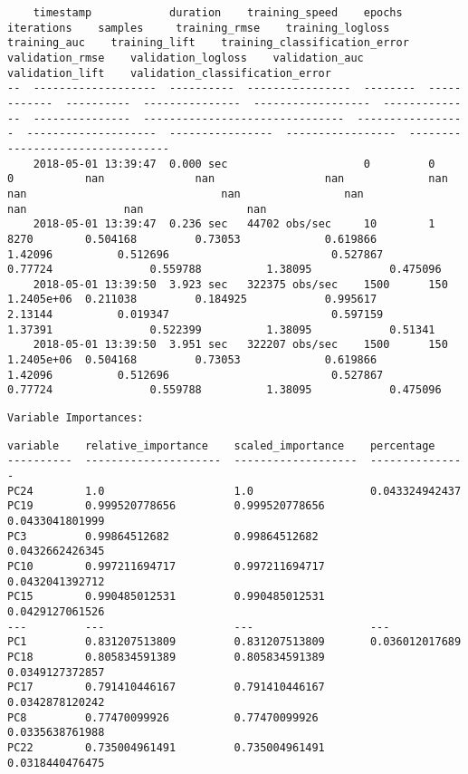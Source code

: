 \documentclass[11pt]{article}
\begin{document}
    
    \begin{verbatim}
    timestamp            duration    training_speed    epochs    iterations    samples     training_rmse    training_logloss    training_auc    training_lift    training_classification_error    validation_rmse    validation_logloss    validation_auc    validation_lift    validation_classification_error
--  -------------------  ----------  ----------------  --------  ------------  ----------  ---------------  ------------------  --------------  ---------------  -------------------------------  -----------------  --------------------  ----------------  -----------------  ---------------------------------
    2018-05-01 13:39:47  0.000 sec                     0         0             0           nan              nan                 nan             nan              nan                              nan                nan                   nan               nan                nan
    2018-05-01 13:39:47  0.236 sec   44702 obs/sec     10        1             8270        0.504168         0.73053             0.619866        1.42096          0.512696                         0.527867           0.77724               0.559788          1.38095            0.475096
    2018-05-01 13:39:50  3.923 sec   322375 obs/sec    1500      150           1.2405e+06  0.211038         0.184925            0.995617        2.13144          0.019347                         0.597159           1.37391               0.522399          1.38095            0.51341
    2018-05-01 13:39:50  3.951 sec   322207 obs/sec    1500      150           1.2405e+06  0.504168         0.73053             0.619866        1.42096          0.512696                         0.527867           0.77724               0.559788          1.38095            0.475096
    \end{verbatim}

    
    \begin{Verbatim}[commandchars=\\\{\}]
Variable Importances: 

    \end{Verbatim}

    
    \begin{verbatim}
variable    relative_importance    scaled_importance    percentage
----------  ---------------------  -------------------  ---------------
PC24        1.0                    1.0                  0.043324942437
PC19        0.999520778656         0.999520778656       0.0433041801999
PC3         0.99864512682          0.99864512682        0.0432662426345
PC10        0.997211694717         0.997211694717       0.0432041392712
PC15        0.990485012531         0.990485012531       0.0429127061526
---         ---                    ---                  ---
PC1         0.831207513809         0.831207513809       0.036012017689
PC18        0.805834591389         0.805834591389       0.0349127372857
PC17        0.791410446167         0.791410446167       0.0342878120242
PC8         0.77470099926          0.77470099926        0.0335638761988
PC22        0.735004961491         0.735004961491       0.0318440476475
    \end{verbatim}
\end{document}
